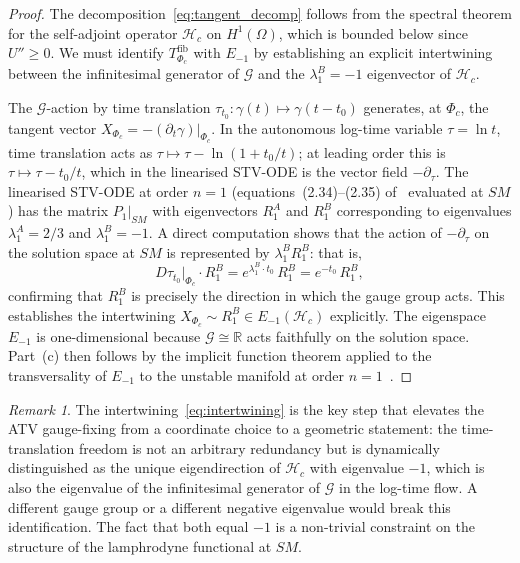 \documentclass[12pt,a4paper]{article}
\theoremstyle{plain}
\theoremstyle{definition}
\theoremstyle{remark}
\newtheorem{remark}[theorem]{Remark}
\newcommand{\Phic}{\Phi_c}
\newcommand{\Ggroup}{\mathcal{G}}
\newcommand{\Hacc}{\mathcal{H}}
\newcommand{\SM}{\mathit{SM}}
\newcommand{\lAn}[1]{\lambda^A_{#1}}
\newcommand{\lBn}[1]{\lambda^B_{#1}}
\begin{document}
\begin{proof}
The decomposition~\eqref{eq:tangent_decomp} follows from the spectral theorem
for the self-adjoint operator $\Hacc_c$ on $H^1(\Omega)$, which is bounded below
since $U''\geq 0$. We must identify $T^{\mathrm{fib}}_{\Phic}$ with $E_{-1}$
by establishing an explicit intertwining between the infinitesimal generator of
$\Ggroup$ and the $\lBn{1} = -1$ eigenvector of $\Hacc_c$.

The $\Ggroup$-action by time translation $\tau_{t_0}:\gamma(t)\mapsto\gamma(t-t_0)$
generates, at $\Phic$, the tangent vector $X_{\Phic} = -(\partial_t\gamma)\big|_{\Phic}$.
In the autonomous log-time variable $\tau = \ln t$, time translation acts as
$\tau\mapsto\tau - \ln(1 + t_0/t)$; at leading order this is $\tau\mapsto\tau - t_0/t$,
which in the linearised STV-ODE is the vector field $-\partial_\tau$. The
linearised STV-ODE at order $n=1$ (equations~(2.34)--(2.35) of~\cite{ATV2026}
evaluated at $\SM$) has the matrix $P_1|_{\SM}$ with eigenvectors $R_1^A$ and
$R_1^B$ corresponding to eigenvalues $\lAn{1} = 2/3$ and $\lBn{1} = -1$. A
direct computation shows that the action of $-\partial_\tau$ on the solution
space at $\SM$ is represented by $\lBn{1}R_1^B$: that is,
\begin{equation}
  D\tau_{t_0}\big|_{\Phic} \cdot R_1^B = e^{\lBn{1}\cdot t_0}\,R_1^B = e^{-t_0}\,R_1^B,
  \label{eq:intertwining}
\end{equation}
confirming that $R_1^B$ is precisely the direction in which the gauge group acts.
This establishes the intertwining $X_{\Phic}\sim R_1^B\in E_{-1}(\Hacc_c)$ explicitly.
The eigenspace $E_{-1}$ is one-dimensional because $\Ggroup\cong\mathbb{R}$ acts
faithfully on the solution space. Part~(c) then follows by the implicit function
theorem applied to the transversality of $E_{-1}$ to the unstable manifold at
order $n=1$~\cite{Hirsch1974}.
\end{proof}

\begin{remark}
The intertwining~\eqref{eq:intertwining} is the key step that elevates the ATV
gauge-fixing from a coordinate choice to a geometric statement: the time-translation
freedom is not an arbitrary redundancy but is dynamically distinguished as the
unique eigendirection of $\Hacc_c$ with eigenvalue $-1$, which is also the
eigenvalue of the infinitesimal generator of $\Ggroup$ in the log-time flow.
A different gauge group or a different negative eigenvalue would break this
identification. The fact that both equal $-1$ is a non-trivial constraint on
the structure of the lamphrodyne functional at $\SM$.
\end{remark}
\end{document}
